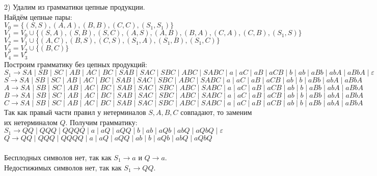 \documentclass[12pt]{article}
\theoremstyle{definition}
\theoremstyle{definition}
\let\ra\rightarrow
\let\epsilon\varepsilon
\begin{document}
2) Удалим из грамматики цепные продукции.\\
Найдём цепные пары:\\
$V_0 = \{(S,S), (A,A), (B,B), (C,C), (S_1, S_1)\}$\\
$V_1 = V_0 \cup \{(S,A), (S,B), (S,C), (A,S), (A,B), (B,A), (C,A), (C,B), (S_1, S)\}$\\
$V_2 = V_1 \cup \{(A,C), (B,S), (C,S), (S_1,A), (S_1,B), (S_1,C)\}$\\
$V_3 = V_2 \cup \{(B,C)\}$\\
$V_4 = V_3$\\

Построим грамматику без цепных продукций:\\
\hspace*{0,5cm}$S_1 \ra SA \mid SB \mid SC \mid AB \mid AC \mid BC \mid SAB \mid SAC \mid SBC \mid ABC \mid SABC \mid a \mid aC \mid aB \mid aCB \mid b \mid ab \mid aBb \mid abA \mid aBbA \mid \epsilon$\\
\hspace*{0,5cm}$S \ra SA \mid SB \mid SC \mid AB \mid AC \mid BC \mid SAB \mid SAC \mid SBC \mid ABC \mid SABC \mid a \mid aC \mid aB \mid aCB \mid ab \mid b \mid aBb \mid abA \mid aBbA$\\
\hspace*{0,5cm}$A \ra SA \mid SB \mid SC \mid AB \mid AC \mid BC \mid SAB \mid SAC \mid SBC \mid ABC \mid SABC \mid a \mid aC \mid aB \mid aCB \mid ab \mid b \mid aBb \mid abA \mid aBbA$\\
\hspace*{0,5cm}$B \ra SA \mid SB \mid SC \mid AB \mid AC \mid BC \mid SAB \mid SAC \mid SBC \mid ABC \mid SABC \mid a \mid aC \mid aB \mid aCB \mid ab \mid b \mid aBb \mid abA \mid aBbA$\\
\hspace*{0,5cm}$C \ra SA \mid SB \mid SC \mid AB \mid AC \mid BC \mid SAB \mid SAC \mid SBC \mid ABC \mid SABC \mid a \mid aC \mid aB \mid aCB \mid ab \mid b \mid aBb \mid abA \mid aBbA$\\

Так как правый части правил у нетерминалов $S, A,B,C$ совпадают, то заменим их нетерминалом $Q$. Получим грамматику:\\
\hspace*{0,5cm}$S_1 \ra QQ \mid QQQ \mid QQQQ \mid a \mid aQ \mid aQQ \mid b \mid ab \mid aQb \mid abQ \mid aQbQ \mid \epsilon$\\
\hspace*{0,5cm}$Q \ra QQ \mid QQQ \mid QQQQ \mid a \mid aQ \mid aQQ \mid ab \mid b \mid aQb \mid abQ \mid aQbQ$\\\\
Бесплодных символов нет, так как $S_1 \ra a$ и $Q \ra a$.\\
Недостижимых символов нет, так как $S_1 \ra QQ$.\\
\end{document}
